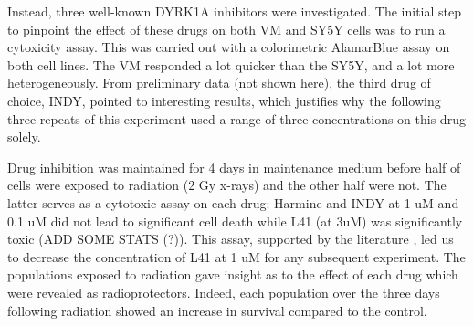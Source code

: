 \documentclass[onecolumn,10pt]{asme2ej}
\begin{document}
Instead, three well-known DYRK1A inhibitors were investigated. The initial step to pinpoint the effect of these drugs on both VM and SY5Y cells was to run a cytoxicity assay. This was carried out with a colorimetric AlamarBlue assay on both cell lines. The VM responded a lot quicker than the SY5Y, and a lot more heterogeneously. From preliminary data (not shown here), the third drug of choice, INDY, pointed to interesting results, which justifies why the following three repeats of this experiment used a range of three concentrations on this drug solely.

Drug inhibition was maintained for 4 days in maintenance medium before half of cells were exposed to radiation (2 Gy x-rays) and the other half were not. The latter serves as a cytotoxic assay on each drug: Harmine and INDY at 1 uM and 0.1 uM did not lead to significant cell death while L41 (at 3uM) was significantly toxic (ADD SOME STATS (?)). This assay, supported by the literature \cite{RUBEN}, led us to decrease the concentration of L41 at 1 uM for any subsequent experiment. 
The populations exposed to radiation gave insight as to the effect of each drug which were revealed as radioprotectors. Indeed, each population over the three days following radiation showed an increase in survival compared to the control.
\end{document}

